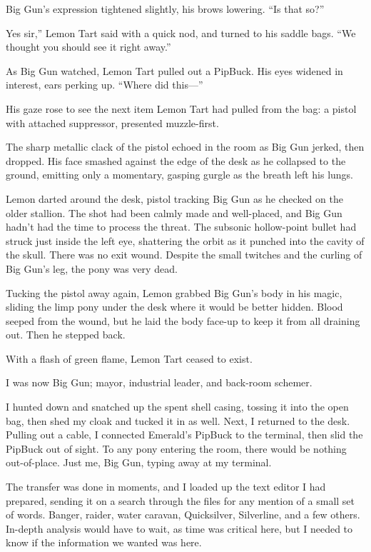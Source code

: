 Big Gun’s expression tightened slightly, his brows lowering. “Is that so?”

\leavevmode{}Yes sir,” Lemon Tart said with a quick nod, and turned to his saddle bags. “We thought you should see it right away.”

As Big Gun watched, Lemon Tart pulled out a PipBuck. His eyes widened in interest, ears perking up. “Where did this—”

His gaze rose to see the next item Lemon Tart had pulled from the bag: a pistol with attached suppressor, presented muzzle-first.

The sharp metallic clack of the pistol echoed in the room as Big Gun jerked, then dropped. His face smashed against the edge of the desk as he collapsed to the ground, emitting only a momentary, gasping gurgle as the breath left his lungs.

Lemon darted around the desk, pistol tracking Big Gun as he checked on the older stallion. The shot had been calmly made and well-placed, and Big Gun hadn’t had the time to process the threat. The subsonic hollow-point bullet had struck just inside the left eye, shattering the orbit as it punched into the cavity of the skull. There was no exit wound. Despite the small twitches and the curling of Big Gun’s leg, the pony was very dead.

Tucking the pistol away again, Lemon grabbed Big Gun’s body in his magic, sliding the limp pony under the desk where it would be better hidden. Blood seeped from the wound, but he laid the body face-up to keep it from all draining out. Then he stepped back.

With a flash of green flame, Lemon Tart ceased to exist.

I was now Big Gun; mayor, industrial leader, and back-room schemer.

I hunted down and snatched up the spent shell casing, tossing it into the open bag, then shed my cloak and tucked it in as well. Next, I returned to the desk. Pulling out a cable, I connected Emerald’s PipBuck to the terminal, then slid the PipBuck out of sight. To any pony entering the room, there would be nothing out-of-place. Just me, Big Gun, typing away at my terminal.

The transfer was done in moments, and I loaded up the text editor I had prepared, sending it on a search through the files for any mention of a small set of words. Banger, raider, water caravan, Quicksilver, Silverline, and a few others. In-depth analysis would have to wait, as time was critical here, but I needed to know if the information we wanted was here.

